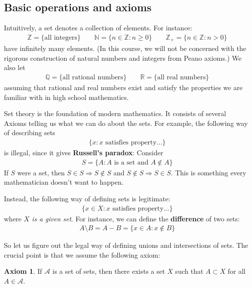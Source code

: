 \documentclass[12pt,b5paper,notitlepage]{article}
\theoremstyle{definition}
\newtheorem*{axiom}{Axiom}
\theoremstyle{plain}
\newcommand{\scr}{\mathscr}
\newcommand{\Nbb}{\mathbb N}
\newcommand{\Zbb}{\mathbb Z}
\newcommand{\Qbb}{\mathbb Q}
\newcommand{\Rbb}{\mathbb R}
\numberwithin{equation}{section}
\begin{document}
\subsection{Basic operations and axioms}
Intuitively, a set denotes a collection of elements. For instance:\index{N@$\Nbb=\{0,1,2,\dots\}$} \index{Z@$\Zbb_+=\{1,2,\dots\}$}
\begin{gather*}
\Zbb=\{\text{all integers}\}\qquad \Nbb=\{n\in\Zbb:n\geq0\}\qquad \Zbb_+=\{n\in\Zbb:n>0\}
\end{gather*}
have infinitely many elements. (In this course, we will not be concerned with the rigorous construction of natural numbers and integers from Peano axioms.) We also let
\begin{align*}
\Qbb=\{\text{all rational numbers}\}\qquad\Rbb=\{\text{all real numbers}\}
\end{align*}
assuming that rational and real numbers exist and satisfy the properties we are familiar with in high school mathematics.


Set theory is the foundation of modern mathematics. It consists of several Axioms telling us what we can do about the sets. For example, the following way of describing sets
\begin{align}
\{x: x\text{ satisfies property...}\}  \label{eq1}
\end{align}
is illegal, since it gives \textbf{Russell's paradox}: Consider
\begin{align}
S=\{A: A\text{ is a set and }A\notin A\}\label{eq12}
\end{align}
If $S$ were a set, then $S\in S\Rightarrow S\notin S$ and $S\notin S\Rightarrow S\in S$. This is something every mathematician doesn't want to happen.

Instead, the following way of defining sets is legitimate:
\begin{align}
\{x\in X:x\text{ satisfies property}\dots\}  \label{eq2}
\end{align}
where \emph{$X$ is a given set}.  For instance, we can define the \textbf{difference} of two sets:
\begin{align*}
A\setminus B=A-B=\{x\in A:x\notin B\}
\end{align*}




So let us figure out the legal way of defining unions and intersections of sets. The crucial point is that we assume the following axiom:
\begin{axiom}
If $\scr A$ is a set of sets, then there exists a set $X$ such that $A\subset X$ for all $A\in\scr A$.
\end{axiom}
\end{document}
